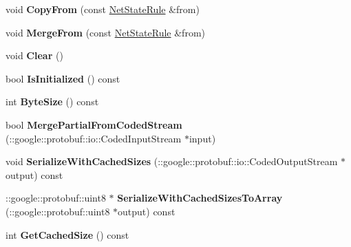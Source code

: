 \begin{DoxyCompactItemize}
\item 
\mbox{\label{classcaffe_1_1_net_state_rule_a3048792ef3e75b81e466f8077213fba8}} 
void {\bfseries Copy\+From} (const \mbox{\hyperlink{classcaffe_1_1_net_state_rule}{Net\+State\+Rule}} \&from)
\item 
\mbox{\label{classcaffe_1_1_net_state_rule_a1fd3a109c8773f2be90f03468345856c}} 
void {\bfseries Merge\+From} (const \mbox{\hyperlink{classcaffe_1_1_net_state_rule}{Net\+State\+Rule}} \&from)
\item 
\mbox{\label{classcaffe_1_1_net_state_rule_a57622cba94a5ee5f78dbf04a33a02be3}} 
void {\bfseries Clear} ()
\item 
\mbox{\label{classcaffe_1_1_net_state_rule_ae839894e8e873564b8bace2cecdd16d7}} 
bool {\bfseries Is\+Initialized} () const
\item 
\mbox{\label{classcaffe_1_1_net_state_rule_ada1c84a2a56b7128d533401370e6dcd1}} 
int {\bfseries Byte\+Size} () const
\item 
\mbox{\label{classcaffe_1_1_net_state_rule_ae713924a94414953f545e076532ba1b8}} 
bool {\bfseries Merge\+Partial\+From\+Coded\+Stream} (\+::google\+::protobuf\+::io\+::\+Coded\+Input\+Stream $\ast$input)
\item 
\mbox{\label{classcaffe_1_1_net_state_rule_a0c123cc511c52b810872514165fec06a}} 
void {\bfseries Serialize\+With\+Cached\+Sizes} (\+::google\+::protobuf\+::io\+::\+Coded\+Output\+Stream $\ast$output) const
\item 
\mbox{\label{classcaffe_1_1_net_state_rule_a170b72714e9afa86a03def9b5a6757fe}} 
\+::google\+::protobuf\+::uint8 $\ast$ {\bfseries Serialize\+With\+Cached\+Sizes\+To\+Array} (\+::google\+::protobuf\+::uint8 $\ast$output) const
\item 
\mbox{\label{classcaffe_1_1_net_state_rule_ad862dcdfd6a79092f740235fad43cc0c}} 
int {\bfseries Get\+Cached\+Size} () const
\item 

\end{DoxyCompactItemize}
